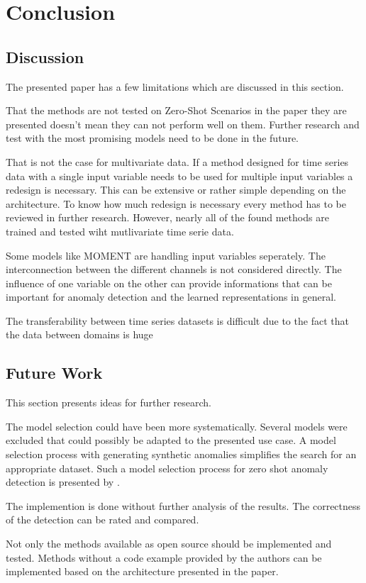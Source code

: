 \section{Conclusion}\label{conclusion}
\subsection{Discussion}
The presented paper has a few limitations which are discussed in this section.

That the methods are not tested on Zero-Shot Scenarios in the paper they are presented doesn't mean they can not perform well on them.  Further research and test with the most promising models need to be done in the future.

That is not the case for multivariate data. If a method designed for time series data with a single input variable needs to be used for multiple input variables a redesign is necessary. This can be extensive or rather simple depending on the architecture. To know how much redesign is necessary every method has to be reviewed in further research. However, nearly all of the found methods are trained and tested wiht mutlivariate time serie data.

Some models like MOMENT are handling input variables seperately. The interconnection between the different channels is not considered directly. The influence of one variable on the other can provide informations that can be important for anomaly detection and the learned representations in general.


The transferability between time series datasets is difficult due to the fact that the data between domains is huge \cite{ma_survey_2023}

\subsection{Future Work}
This section presents ideas for further research.

The model selection could have been more systematically. Several models were excluded that could possibly be adapted to the presented use case. A model selection process with generating synthetic anomalies simplifies the search for an appropriate dataset. Such a model selection process for zero shot anomaly detection is presented by \cite{fung_model_2024}.

The implemention is done without further analysis of the results. The correctness of the detection can be rated and compared.

%
Not only the methods available as open source should be implemented and tested. Methods without a code example provided by the authors can be implemented based on the architecture presented in the paper.
